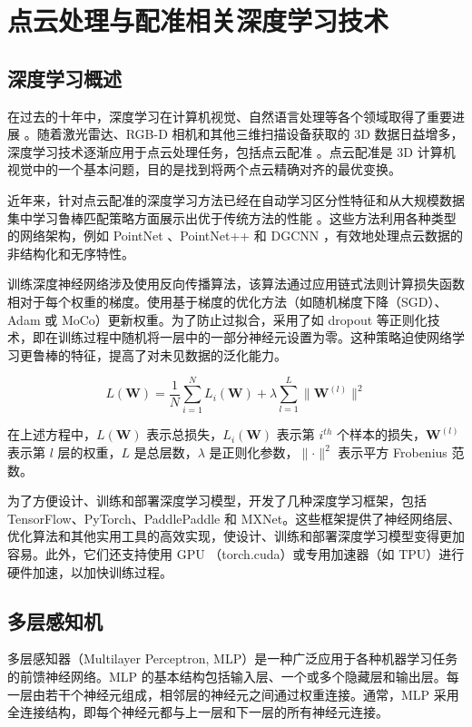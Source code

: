\section{点云处理与配准相关深度学习技术}

\subsection{深度学习概述}
在过去的十年中，深度学习在计算机视觉、自然语言处理等各个领域取得了重要进展 \cite{lecun2015deep}。随着激光雷达、RGB-D 相机和其他三维扫描设备获取的 3D 数据日益增多，深度学习技术逐渐应用于点云处理任务，包括点云配准 \cite{wang2019dynamic, choy2020deep}。点云配准是 3D 计算机视觉中的一个基本问题，目的是找到将两个点云精确对齐的最优变换。

近年来，针对点云配准的深度学习方法已经在自动学习区分性特征和从大规模数据集中学习鲁棒匹配策略方面展示出优于传统方法的性能 \cite{huang2022multiway, lu2019deepvcp}。这些方法利用各种类型的网络架构，例如 PointNet \cite{qi2017pointnet}、PointNet++ \cite{qi2017pointnet++} 和 DGCNN \cite{wang2019dynamic}，有效地处理点云数据的非结构化和无序特性。

训练深度神经网络涉及使用反向传播算法，该算法通过应用链式法则计算损失函数相对于每个权重的梯度。使用基于梯度的优化方法（如随机梯度下降（SGD）、Adam\cite{kingma2014adam} 或 MoCo\cite{he2020momentum}）更新权重。为了防止过拟合，采用了如 dropout 等正则化技术，即在训练过程中随机将一层中的一部分神经元设置为零。这种策略迫使网络学习更鲁棒的特征，提高了对未见数据的泛化能力。

\begin{equation}
    L(\boldsymbol{W}) = \frac{1}{N} \sum_{i=1}^{N} L_i(\boldsymbol{W}) + \lambda \sum_{l=1}^{L} \lVert \boldsymbol{W}^{(l)} \rVert^2
\end{equation}

在上述方程中，$L(\boldsymbol{W})$ 表示总损失，$L_i(\boldsymbol{W})$ 表示第 $i^{th}$ 个样本的损失，$\boldsymbol{W}^{(l)}$ 表示第 $l$ 层的权重，$L$ 是总层数，$\lambda$ 是正则化参数，$\lVert \cdot \rVert^2$ 表示平方 Frobenius 范数。

为了方便设计、训练和部署深度学习模型，开发了几种深度学习框架，包括TensorFlow\cite{abadi2016tensorflow}、PyTorch\cite{paszke2019pytorch}、PaddlePaddle\cite{ma2019paddlepaddle} 和 MXNet\cite{chen2015mxnet}。这些框架提供了神经网络层、优化算法和其他实用工具的高效实现，使设计、训练和部署深度学习模型变得更加容易。此外，它们还支持使用 GPU （torch.cuda）或专用加速器（如 TPU）进行硬件加速，以加快训练过程。
\subsection{多层感知机}
多层感知器（Multilayer Perceptron, MLP）是一种广泛应用于各种机器学习任务的前馈神经网络\cite{lecun2015deep}。MLP 的基本结构包括输入层、一个或多个隐藏层和输出层。每一层由若干个神经元组成，相邻层的神经元之间通过权重连接。通常，MLP 采用全连接结构，即每个神经元都与上一层和下一层的所有神经元连接。

